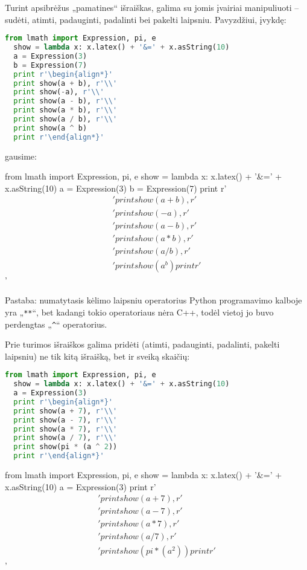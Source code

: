 Turint apsibrėžus „pamatines“ išraiškas, galima su jomis įvairiai 
manipuliuoti – sudėti, atimti, padauginti, padalinti bei pakelti
laipsniu. Pavyzdžiui, įvykdę:
\begin{lstlisting}[language=python]
  from lmath import Expression, pi, e
  show = lambda x: x.latex() + '&=' + x.asString(10)
  a = Expression(3)
  b = Expression(7)
  print r'\begin{align*}'
  print show(a + b), r'\\'
  print show(-a), r'\\'
  print show(a - b), r'\\'
  print show(a * b), r'\\'
  print show(a / b), r'\\'
  print show(a ^ b)    
  print r'\end{align*}'
\end{lstlisting}
gausime:
\begin{python}%
from lmath import Expression, pi, e
show = lambda x: x.latex() + '&=' + x.asString(10)
a = Expression(3)
b = Expression(7)
print r'\begin{align*}'
print show(a + b), r'\\'
print show(-a), r'\\'
print show(a - b), r'\\'
print show(a * b), r'\\'
print show(a / b), r'\\'
print show(a ^ b)
print r'\end{align*}'
\end{python}

Pastaba: numatytasis kėlimo laipsniu operatorius Python programavimo kalboje
yra „\verb|**|“, bet kadangi tokio operatoriaus nėra C++, todėl vietoj jo 
buvo perdengtas „\verb|^|“ operatorius.

Prie turimos išraiškos galima pridėti (atimti, padauginti, padalinti, 
pakelti laipsniu) ne tik kitą išraišką, bet ir sveiką skaičių:
\begin{lstlisting}[language=python]
  from lmath import Expression, pi, e
  show = lambda x: x.latex() + '&=' + x.asString(10)
  a = Expression(3)
  print r'\begin{align*}'
  print show(a + 7), r'\\'
  print show(a - 7), r'\\'
  print show(a * 7), r'\\'
  print show(a / 7), r'\\'
  print show(pi * (a ^ 2))
  print r'\end{align*}'
\end{lstlisting}
\begin{python}%
from lmath import Expression, pi, e
show = lambda x: x.latex() + '&=' + x.asString(10)
a = Expression(3)
print r'\begin{align*}'
print show(a + 7), r'\\'
print show(a - 7), r'\\'
print show(a * 7), r'\\'
print show(a / 7), r'\\'
print show(pi * (a ^ 2))
print r'\end{align*}'
\end{python}

